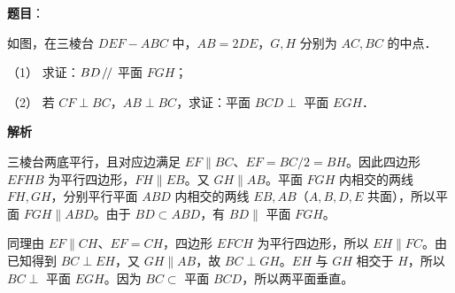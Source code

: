 \begin{answer}

\textbf{题目}：

如图，在三棱台 \(DEF-ABC\) 中，\(AB=2DE\)，\(G,H\) 分别为 \(AC,BC\) 的中点．
\nopagebreak[4]
\begin{center}\end{center}
\nopagebreak[4]
（1） 求证：\(BD\mathrel{\mkern-3mu/\mkern-2mu/}\) 平面 \(FGH\)；

（2） 若 \(CF\perp BC\)，\(AB\perp BC\)，求证：平面 \(BCD\perp\) 平面 \(EGH\)．

\textbf{解析}


三棱台两底平行，且对应边满足 \(EF\parallel BC\)、\(EF=BC/2=BH\)。因此四边形 \(EFHB\) 为平行四边形，\(FH\parallel EB\)。又 \(GH\parallel AB\)。平面 \(FGH\) 内相交的两线 \(FH,GH\)，分别平行平面 \(ABD\) 内相交的两线 \(EB,AB\)（\(A,B,D,E\) 共面），所以平面 \(FGH\parallel ABD\)。由于 \(BD\subset ABD\)，有 \(BD\parallel\) 平面 \(FGH\)。


同理由 \(EF\parallel CH\)、\(EF=CH\)，四边形 \(EFCH\) 为平行四边形，所以 \(EH\parallel FC\)。由已知得到 \(BC\perp EH\)，又 \(GH\parallel AB\)，故 \(BC\perp GH\)。\(EH\) 与 \(GH\) 相交于 \(H\)，所以 \(BC\perp\) 平面 \(EGH\)。因为 \(BC\subset\) 平面 \(BCD\)，所以两平面垂直。



\end{answer}
